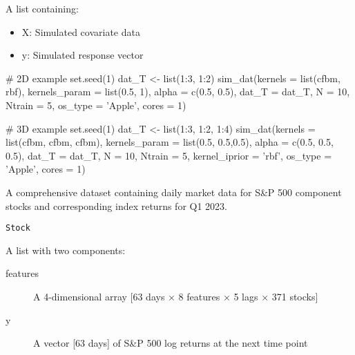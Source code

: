 \documentclass[a4paper]{book}
\begin{document}
%
\begin{Value}
A list containing:
\begin{itemize}

\item{} X: Simulated covariate data
\item{} y: Simulated response vector

\end{itemize}

\end{Value}
%
\begin{SeeAlso}
\end{SeeAlso}
%
\begin{Examples}
\begin{ExampleCode}
# 2D example
set.seed(1)
dat_T <- list(1:3, 1:2)
sim_dat(kernels = list(cfbm, rbf), kernels_param = list(0.5, 1),
alpha = c(0.5, 0.5), dat_T = dat_T, N = 10, Ntrain = 5, os_type = 'Apple', cores = 1)

# 3D example
set.seed(1)
dat_T <- list(1:3, 1:2, 1:4)
sim_dat(kernels = list(cfbm, cfbm, cfbm), kernels_param = list(0.5, 0.5,0.5),
alpha = c(0.5, 0.5, 0.5), dat_T = dat_T, N = 10, Ntrain = 5,
kernel_iprior = 'rbf', os_type = 'Apple', cores = 1)

\end{ExampleCode}
\end{Examples}
%
\begin{Description}
A comprehensive dataset containing daily market data for S\&P 500 component stocks
and corresponding index returns for Q1 2023.
\end{Description}
%
\begin{Usage}
\begin{verbatim}
Stock
\end{verbatim}
\end{Usage}
%
\begin{Format}
A list with two components:
\begin{description}

\item[features] A 4-dimensional array [63 days × 8 features × 5 lags × 371 stocks]
\item[y] A vector [63 days] of S\&P 500 log returns at the next time point

\end{description}

\end{Format}
\end{document}
